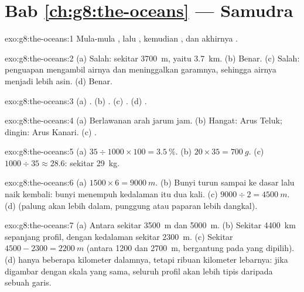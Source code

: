 \section*{Bab \ref{ch:g8:the-oceans} --- Samudra}

\begin{solution}{exo:g8:the-oceans:1}
Mula-mula , lalu , kemudian , dan akhirnya .
\end{solution}

\begin{solution}{exo:g8:the-oceans:2}
(a) Salah: sekitar \qty{3700}{m}, yaitu \qty{3.7}{km}. (b) Benar. (c)
Salah: penguapan mengambil airnya dan meninggalkan garamnya, sehingga
airnya menjadi lebih asin. (d) Benar.
\end{solution}

\begin{solution}{exo:g8:the-oceans:3}
(a) . (b) . (c) . (d) .
\end{solution}

\begin{solution}{exo:g8:the-oceans:4}
(a) Berlawanan arah jarum jam. (b) Hangat: Arus Teluk; dingin: Arus
Kanari. (c) .
\end{solution}

\begin{solution}{exo:g8:the-oceans:5}
(a) $35 \div 1000 \times 100 = 3.5~\%$. (b) $20 \times 35 = \qty{700}{g}$.
(c) $1000 \div 35 \approx 28.6$: sekitar \qty{29}{kg}.
\end{solution}

\begin{solution}{exo:g8:the-oceans:6}
(a) $1500 \times 6 = \qty{9000}{m}$. (b) Bunyi turun sampai ke dasar lalu
naik kembali: bunyi menempuh kedalaman itu dua kali. (c) $9000 \div 2 =
\qty{4500}{m}$. (d)  (palung akan lebih dalam, punggung
atau paparan lebih dangkal).
\end{solution}

\begin{solution}{exo:g8:the-oceans:7}
(a) Antara sekitar \qty{3500}{m} dan \qty{5000}{m}. (b) Sekitar
\qty{4400}{km} sepanjang profil, dengan kedalaman sekitar \qty{2300}{m}.
(c) Sekitar $4500 - 2300 = \qty{2200}{m}$ (antara 1200 dan
\qty{2700}{m}, bergantung pada  yang dipilih). (d)  hanya
beberapa kilometer dalamnya, tetapi ribuan kilometer lebarnya: jika
digambar dengan skala yang sama, seluruh profil akan lebih tipis daripada
sebuah garis.
\end{solution}

